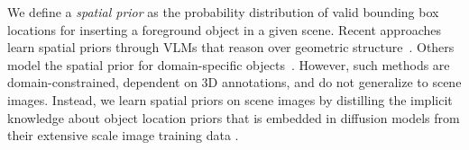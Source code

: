 We define a \textit{spatial prior} as the probability distribution of valid bounding box locations for inserting a foreground object in a given scene.
Recent approaches learn spatial priors through VLMs that reason over geometric structure~\cite{abdelreheem2025Placeit3d,huang2025fireplace}. Others model the spatial prior for domain-specific objects~\cite{rishubh2025monoplace3D,petersen2025scene}. However, such methods are domain-constrained, dependent on 3D annotations, and do not generalize to scene images. Instead, we learn spatial priors on scene images by distilling the implicit knowledge about object location priors that is embedded in diffusion models from their extensive scale image training data \cite{schuhmann2022laion}.



